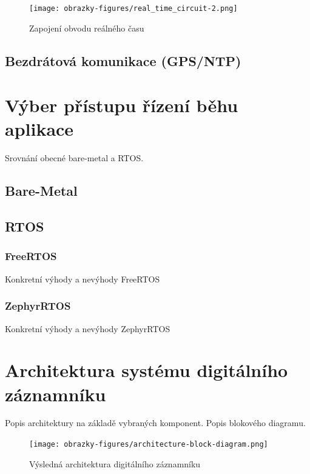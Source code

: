 \begin{figure}[h]
    \centering
    \texttt{[image: obrazky-figures/real\_time\_circuit-2.png]}
    
    \caption{Zapojení obvodu reálného času}
    \label{fig:real-time-circuit}
\end{figure}

\subsection{Bezdrátová komunikace (GPS/NTP)}

\section{Výber přístupu řízení běhu aplikace}
Srovnání obecné bare-metal a RTOS.


\subsection{Bare-Metal}

\subsection{RTOS}
\subsubsection{FreeRTOS}
Konkretní výhody a nevýhody FreeRTOS

\subsubsection{ZephyrRTOS}
Konkretní výhody a nevýhody ZephyrRTOS


\section{Architektura systému digitálního záznamníku}
Popis architektury na základě vybraných komponent. Popis blokového diagramu.

\begin{figure}[h]
    \centering
    \texttt{[image: obrazky-figures/architecture-block-diagram.png]}
    
    \caption{Výsledná architektura digitálního záznamníku}
    \label{fig:low-power-modes}
\end{figure}

